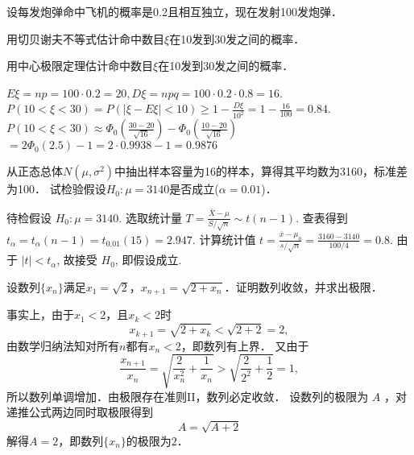 \begin{question}
设每发炮弹命中飞机的概率是0.2且相互独立，现在发射100发炮弹．\par
 用切贝谢夫不等式估计命中数目$\xi$在10发到30发之间的概率．\par
 用中心极限定理估计命中数目$\xi$在10发到30发之间的概率．
\end{question}

\begin{solution}
$E\xi = n p = 100 \cdot 0.2 = 20, D\xi = n p q = 100 \cdot 0.2 \cdot 0.8 = 16$. 
 $P (10 < \xi < 30) = P (| \xi - E \xi | < 10) \ge 1 - \frac{D\xi}{10^2}
     = 1 - \frac{16}{100} = 0.84$. 
 $P (10 < \xi < 30) \approx \Phi_0 \left( \frac{30 - 20}{\sqrt{16}}\right)
     - \Phi_0 \left( \frac{10 - 20}{\sqrt{16}} \right)$ 
\qquad $= 2 \Phi_0 (2.5) - 1 = 2 \cdot 0.9938 - 1 =0.9876$ 
\end{solution}


\begin{question}
从正态总体$N(\mu,\sigma^2)$中抽出样本容量为16的样本，算得其平均数为3160，标准差为100．
试检验假设$H_0:\mu=3140$是否成立($\alpha = 0.01$)．
\end{question}

\begin{solution}
 待检假设 $H_0 : \mu = 3140$. 
 选取统计量 $T = \frac{\bar{X}-\mu}{S / \sqrt{n}} \sim t(n-1)$. 
 查表得到 $t_{\alpha} = t_{\alpha} (n - 1) = t_{0.01} (15) =2.947$. 
 计算统计值 $t = \frac{\bar{x} - \mu_0}{s/\sqrt{n}} =\frac{3160-3140}{100/4} = 0.8$.
 由于 $| t | < t_{\alpha}$, 故接受 $H_0$, 即假设成立. 
\end{solution}


\begin{question}
设数列$\{x_n\}$满足$x_1=\sqrt2$，$x_{n+1}=\sqrt{2+x_n}$．证明数列收敛，并求出极限．
\end{question}

\begin{solution}
事实上，由于$x_1<2$，且$x_k<2$时
\[x_{k+1}=\sqrt{2+x_k}<\sqrt{2+2}=2,\]
由数学归纳法知对所有$n$都有$x_n<2$，即数列有上界．
又由于
\[\frac{x_{n+1}}{x_n}=\sqrt{\frac{2}{x_n^2}+\frac{1}{x_n}}>\sqrt{\frac{2}{2^2}+\frac{1}{2}}=1,\]
所以数列单调增加．由极限存在准则II，数列必定收敛．
设数列的极限为 $A$ ，对递推公式两边同时取极限得到
\[A=\sqrt{A+2}\]
解得$A=2$，即数列$\{x_n\}$的极限为$2$．
\end{solution}



